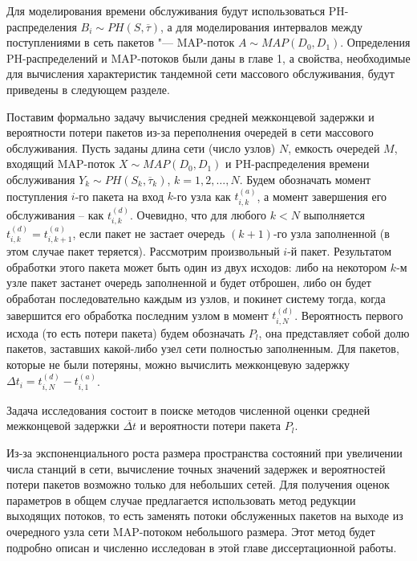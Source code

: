 Для моделирования времени обслуживания будут использоваться PH-распределения $B_i \sim PH(S, \overline{\tau})$, а для моделирования интервалов между поступлениями в сеть пакетов "--- MAP-поток $A \sim MAP(D_0, D_1)$. Определения PH-распределений и MAP-потоков были даны в главе 1, а свойства, необходимые для вычисления характеристик тандемной сети массового обслуживания, будут приведены в следующем разделе.

Поставим формально задачу вычисления средней межконцевой задержки и вероятности потери пакетов из-за переполнения очередей в сети массового обслуживания. Пусть заданы длина сети (число узлов) $N$, емкость очередей $M$, входящий MAP-поток $X \sim MAP(D_0, D_1)$ и PH-распределения времени обслуживания $Y_k \sim PH(S_k, \overline{\tau}_k)$, $k = 1, 2, \dots, N$. Будем обозначать момент поступления $i$-го пакета на вход $k$-го узла как $t_{i,k}^{(a)}$, а момент завершения его обслуживания -- как $t_{i,k}^{(d)}$. Очевидно, что для любого $k < N$ выполняется $t_{i,k}^{(d)} = t_{i,{k+1}}^{(a)}$, если пакет не застает очередь $(k+1)$-го узла заполненной (в этом случае пакет теряется). Рассмотрим произвольный $i$-й пакет. Результатом обработки этого пакета может быть один из двух исходов: либо на некотором $k$-м узле пакет застанет очередь заполненной и будет отброшен, либо он будет обработан последовательно каждым из узлов, и покинет систему тогда, когда завершится его обработка последним узлом в момент $t_{i,N}^{(d)}$. Вероятность первого исхода (то есть потери пакета) будем обозначать $P_l$, она представляет собой долю пакетов, заставших какой-либо узел сети полностью заполненным. Для пакетов, которые не были потеряны, можно вычислить межконцевую задержку $\Delta t_i = t^{(d)}_{i,N} - t^{(a)}_{i,1}$.

Задача исследования состоит в поиске методов численной оценки средней межконцевой задержки $\overline{\Delta t}$ и вероятности потери пакета $P_l$.

Из-за экспоненциального роста размера пространства состояний при увеличении числа станций в сети, вычисление точных значений задержек и вероятностей потери пакетов возможно только для небольших сетей. Для получения оценок параметров в общем случае предлагается использовать метод редукции выходящих потоков, то есть заменять потоки обслуженных пакетов на выходе из очередного узла сети MAP-потоком небольшого размера. Этот метод будет подробно описан и численно исследован в этой главе диссертационной работы.




